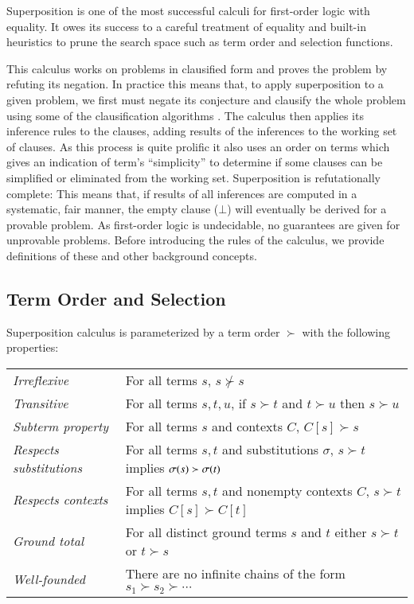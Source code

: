 Superposition is one of the most successful calculi for first-order logic with
equality. It owes its success to a careful treatment of equality and built-in
heuristics to prune the search space such as term order and selection functions.

This calculus works on problems in clausified form and proves the problem by
refuting its negation. In practice this means that, to apply superposition to a
given problem, we first must negate its conjecture and clausify the whole
problem using some of the clausification algorithms
\cite{nw-01-small-cnf,rsv-16-vcnf}. The calculus then applies its inference
rules to the clauses, adding results of the inferences to the working set of
clauses. As this process is quite prolific it also uses an order on terms which gives an indication of
term's ``simplicity'' to determine
if some clauses can be simplified or eliminated from the working set.
Superposition is refutationally complete: This means that, if results of all
inferences are computed in a systematic, fair manner, the empty clause ($\bot$) will
eventually be derived for a provable problem. As first-order logic is
undecidable, no guarantees are given for unprovable problems.
Before introducing the rules of the calculus, we provide definitions of these and other
background concepts.

\subsection{Term Order and Selection}
\label{sec:pre:order}
Superposition calculus is parameterized by a
term order $\succ$ with the following properties:

\noindent\begin{tabular}{p{}p{}}
    \textit{Irreflexive} & For all terms $s$, $s \not\succ s$ \\
    \textit{Transitive} & For all terms $s, t, u$,  if $s\succ t$ and $t \succ u$ then $s \succ u$ \\ 
    \textit{Subterm property} & For all terms $s$ and contexts $C$, $C[s] \succ s$ \\
    \textit{Respects substitutions} & For all terms $s, t$ and substitutions $\sigma$, $s \succ t$ implies $\sigma(s) \succ \sigma(t)$ \\
    \textit{Respects contexts} & For all terms $s,t$ and nonempty contexts $C$, $s \succ t$ implies $C[s] \succ C[t]$ \\
    \textit{Ground total} & For all distinct
    ground terms $s$ and $t$ either $s \succ t$ or $t \succ s$ \\
    \textit{Well-founded} & There are no infinite chains of the form $s_1 \succ s_2 \succ \cdots$ 
\end{tabular}

